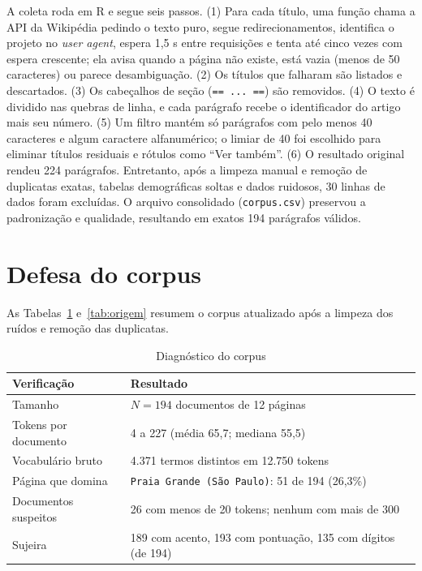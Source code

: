 \documentclass[
  article,
  12pt,
  oneside,
  a4paper,
  english,
  brazil
]{abntex2}
\begin{document}
A coleta roda em R e segue seis passos. (1) Para cada título, uma função chama
a API da Wikipédia pedindo o texto puro, segue redirecionamentos, identifica o
projeto no \emph{user agent}, espera 1,5 s entre requisições e tenta até cinco
vezes com espera crescente; ela avisa quando a página não existe, está vazia
(menos de 50 caracteres) ou parece desambiguação. (2) Os títulos que falharam
são listados e descartados. (3) Os cabeçalhos de seção (\texttt{== ... ==}) são
removidos. (4) O texto é dividido nas quebras de linha, e cada parágrafo recebe
o identificador do artigo mais seu número. (5) Um filtro mantém só parágrafos
com pelo menos 40 caracteres e algum caractere alfanumérico; o limiar de 40
foi escolhido para eliminar títulos residuais e rótulos como ``Ver também''.
(6) O resultado original rendeu 224 parágrafos. Entretanto, após a limpeza
manual e remoção de duplicatas exatas, tabelas demográficas soltas e dados
ruidosos, 30 linhas de dados foram excluídas. O arquivo consolidado
(\texttt{corpus.csv}) preservou a padronização e qualidade, resultando em
exatos 194 parágrafos válidos.

\section{Defesa do corpus}

As Tabelas~\ref{tab:diag} e~\ref{tab:origem} resumem o corpus atualizado após
a limpeza dos ruídos e remoção das duplicatas.

\begin{table}[htb]
  \centering
  \caption{Diagnóstico do corpus}
  \label{tab:diag}
  \small
  \begin{tabular}{@{}p{}p{}@{}}
    \toprule
    \textbf{Verificação} & \textbf{Resultado} \\
    \midrule
    Tamanho                 & $N = 194$ documentos de 12 páginas \\
    Tokens por documento    & 4 a 227 (média 65,7; mediana 55,5) \\
    Vocabulário bruto       & 4.371 termos distintos em 12.750 tokens \\
    Página que domina       & \texttt{Praia Grande (São Paulo)}: 51 de 194 (26,3\%) \\
    Documentos suspeitos    & 26 com menos de 20 tokens; nenhum com mais de 300 \\
    Sujeira                 & 189 com acento, 193 com pontuação, 135 com dígitos (de 194) \\
    \bottomrule
  \end{tabular}
\end{table}
\end{document}
